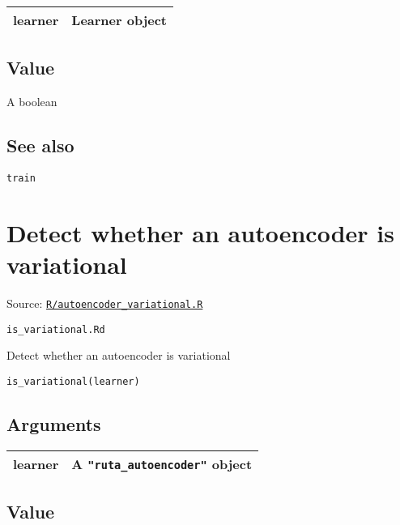\begin{longtable}[c]{@{}ll@{}}
\toprule
learner & Learner object\tabularnewline
\bottomrule
\end{longtable}

\hypertarget{value}{\subsection{\texorpdfstring{\protect\hyperlink{value}{}Value}{Value}}\label{value}}

A boolean

\hypertarget{see-also}{\subsection{\texorpdfstring{\protect\hyperlink{see-also}{}See
also}{See also}}\label{see-also}}

\texttt{train}

\section{Detect whether an autoencoder is
variational}\label{detect-whether-an-autoencoder-is-variational}

Source:
\href{https://github.com/fdavidcl/ruta/blob/master/R/autoencoder_variational.R}{\texttt{R/autoencoder\_variational.R}}

\texttt{is\_variational.Rd}

Detect whether an autoencoder is variational

\begin{verbatim}
is_variational(learner)
\end{verbatim}

\hypertarget{arguments}{\subsection{\texorpdfstring{\protect\hyperlink{arguments}{}Arguments}{Arguments}}\label{arguments}}

\begin{longtable}[c]{@{}ll@{}}
\toprule
learner & A \texttt{"ruta\_autoencoder"} object\tabularnewline
\bottomrule
\end{longtable}

\hypertarget{value}{\subsection{\texorpdfstring{\protect\hyperlink{value}{}Value}{Value}}\label{value}}

